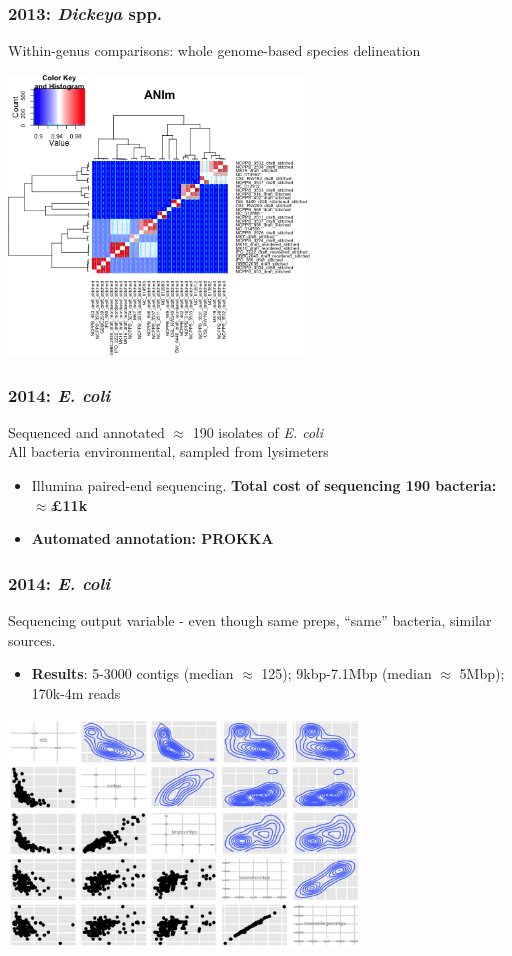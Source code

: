 \begin{frame}
  \frametitle{2013: \textit{Dickeya} spp.}
  Within-genus comparisons: whole genome-based species delineation
  \begin{center}
    \includegraphics[width=0.6\textwidth]{images/dickeya_ani}
  \end{center}      
\end{frame}

\begin{frame}
  \frametitle{2014: \textit{E. coli}}
  Sequenced and annotated $\approx$ 190 isolates of \textit{E. coli} \\
  All bacteria environmental, sampled from lysimeters
  \begin{itemize}
    \item Illumina paired-end sequencing. \textbf{Total cost of sequencing 190 bacteria: $\approx$\pounds11k}
    \item \textbf{Automated annotation: PROKKA}
  \end{itemize}  
\end{frame}

\begin{frame}
  \frametitle{2014: \textit{E. coli}}
  Sequencing output variable - even though same preps, ``same'' bacteria, similar sources.
  \begin{itemize}
    \item \textbf{Results}: 5-3000 contigs (median $\approx$ 125); 9kbp-7.1Mbp (median $\approx$ 5Mbp); 170k-4m reads
  \end{itemize}  
  \begin{center}
    \includegraphics[width=0.7\textwidth]{images/ecoli_sequencing_variation}
  \end{center}      
\end{frame}

